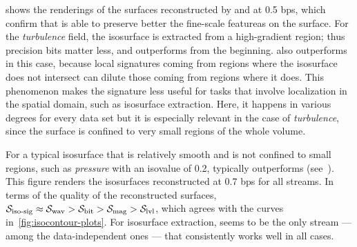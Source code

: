  shows the renderings of the surfaces reconstructed by \sbit
and \swav at 0.5 bps, which confirm that \sbit is able to preserve better the fine-scale featureas
on the surface. For the \emph{turbulence} field, the isosurface is extracted from a high-gradient
region; thus precision bits matter less, and \sbit outperforms \swav from the beginning. \sbit also
outperforms \sisg in this case, because local signatures coming from regions where the isosurface
does not intersect can dilute those coming from regions where it does. This phenomenon makes the
signature less useful for tasks that involve localization in the spatial domain, such as isosurface
extraction. Here, it happens in various degrees for every data set but it is especially relevant in
the case of \emph{turbulence}, since the surface is confined to very small regions of the whole
volume.

For a typical isosurface that is relatively smooth and is not confined to small regions, such as
\emph{pressure} with an isovalue of 0.2, \swav typically outperforms \sbit
(see~). This figure
renders the isosurfaces reconstructed at 0.7 bps for all streams. In terms of the quality of the
reconstructed surfaces, $\sisg \approx \swav > \sbit > \smag > \slvl$, which agrees with the curves
in~\autoref{fig:isocontour-plots}. For isosurface extraction, \swav seems to be the only stream ---
among the data-independent ones --- that consistently works well in all cases.
